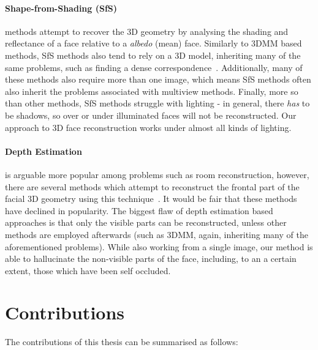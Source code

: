 \paragraph{Shape-from-Shading (SfS)} methods attempt to recover the 3D
geometry by analysing the shading and reflectance of a face relative
to a \textit{albedo} (mean) face. Similarly to 3DMM based methods, SfS
methods also tend to rely on a 3D model, inheriting many of the same
problems, such as finding a dense
correspondence~\cite{suwajanakorn2014total,jiang20183d}. Additionally,
many of these methods also require more than one image, which means
SfS methods often also inherit the problems associated with multiview
methods. Finally, more so than other methods, SfS methods struggle
with lighting - in general, there \textit{has} to be shadows, so over
or under illuminated faces will not be reconstructed. Our approach to
3D face reconstruction works under almost all kinds of lighting.

\paragraph{Depth Estimation} is arguable more popular among problems
such as room reconstruction, however, there are several methods which
attempt to reconstruct the frontal part of the facial 3D geometry
using this technique~\cite{sun2011depth,sun2013depth}. It would be
fair that these methods have declined in popularity. The biggest flaw
of depth estimation based approaches is that only the visible parts
can be reconstructed, unless other methods are employed afterwards
(such as 3DMM, again, inheriting many of the aforementioned
problems). While also working from a single image, our method is able
to hallucinate the non-visible parts of the face, including, to an a
certain extent, those which have been self occluded.

\section{Contributions}

The contributions of this thesis can be summarised as follows:

